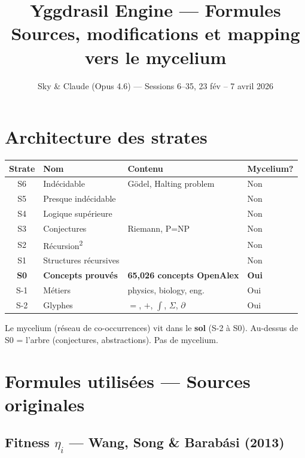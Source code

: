 \documentclass[11pt,a4paper]{article}
\title{\textbf{Yggdrasil Engine --- Formules} \\[0.5em]
\large Sources, modifications et mapping vers le mycelium}
\author{Sky \& Claude (Opus 4.6) --- Sessions 6--35, 23 f\'ev -- 7 avril 2026}
\date{}
\begin{document}
\maketitle

\section{Architecture des strates}

\begin{center}
\begin{tabular}{clll}
\toprule
\textbf{Strate} & \textbf{Nom} & \textbf{Contenu} & \textbf{Mycelium?} \\
\midrule
S6 & Ind\'ecidable & G\"odel, Halting problem & Non \\
S5 & Presque ind\'ecidable & & Non \\
S4 & Logique sup\'erieure & & Non \\
S3 & Conjectures & Riemann, P=NP & Non \\
S2 & R\'ecursion\textsuperscript{2} & & Non \\
S1 & Structures r\'ecursives & & Non \\
\midrule
\textbf{S0} & \textbf{Concepts prouv\'es} & \textbf{65,026 concepts OpenAlex} & \textbf{Oui} \\
S-1 & M\'etiers & physics, biology, eng. & Oui \\
S-2 & Glyphes & $=$, $+$, $\int$, $\Sigma$, $\partial$ & Oui \\
\bottomrule
\end{tabular}
\end{center}

Le mycelium (r\'eseau de co-occurrences) vit dans le \textbf{sol} (S-2 \`a S0).
Au-dessus de S0 = l'arbre (conjectures, abstractions). Pas de mycelium.

\section{Formules utilis\'ees --- Sources originales}

\subsection{Fitness $\eta_i$ --- Wang, Song \& Barab\'asi (2013)}
\end{document}
